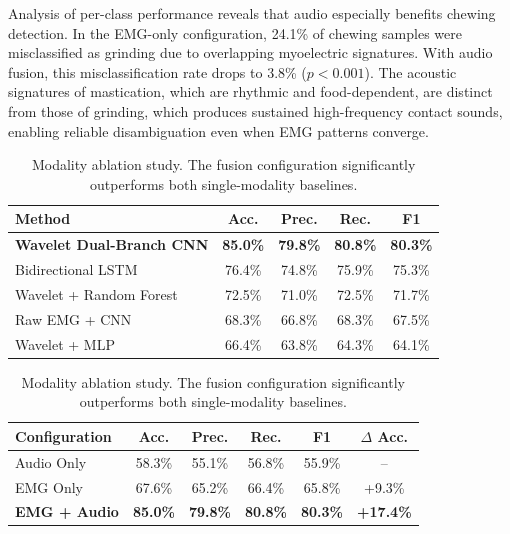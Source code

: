 \documentclass[pdflatex,sn-nature,iicol]{sn-jnl}
\begin{document}
Analysis of per-class performance reveals that audio especially benefits chewing detection. In the EMG-only configuration, 24.1\% of chewing samples were misclassified as grinding due to overlapping myoelectric signatures. With audio fusion, this misclassification rate drops to 3.8\% ($p < 0.001$). The acoustic signatures of mastication, which are rhythmic and food-dependent, are distinct from those of grinding, which produces sustained high-frequency contact sounds, enabling reliable disambiguation even when EMG patterns converge.


\begin{table}[t]
  \centering

  \caption{Classification performance comparison. All differences between the proposed method and the baselines are statistically significant ($p < 0.001$).}
  \label{tab:results}
  \begin{tabular}{lcccc}
    \toprule
    Method & Acc. & Prec. & Rec. & F1 \\
    \midrule
    \textbf{Wavelet Dual-Branch CNN} & \textbf{85.0\%} & \textbf{79.8\%} & \textbf{80.8\%} & \textbf{80.3\%} \\
    Bidirectional LSTM & 76.4\% & 74.8\% & 75.9\% & 75.3\% \\
    Wavelet + Random Forest & 72.5\% & 71.0\% & 72.5\% & 71.7\% \\
    Raw EMG + CNN & 68.3\% & 66.8\% & 68.3\% & 67.5\% \\
    Wavelet + MLP & 66.4\% & 63.8\% & 64.3\% & 64.1\% \\
    \bottomrule
  \end{tabular}

  \vspace{2.5em} %

  \caption{Modality ablation study. The fusion configuration significantly outperforms both single-modality baselines.}
  \label{tab:modality_ablation}
  \begin{tabular}{lccccc}
    \toprule
    Configuration & Acc. & Prec. & Rec. & F1 & $\Delta$ Acc. \\
    \midrule
    Audio Only & 58.3\% & 55.1\% & 56.8\% & 55.9\% & -- \\
    EMG Only & 67.6\% & 65.2\% & 66.4\% & 65.8\% & +9.3\% \\
    \textbf{EMG + Audio} & \textbf{85.0\%} & \textbf{79.8\%} & \textbf{80.8\%} & \textbf{80.3\%} & \textbf{+17.4\%} \\
    \bottomrule
  \end{tabular}


\end{table}
\end{document}
